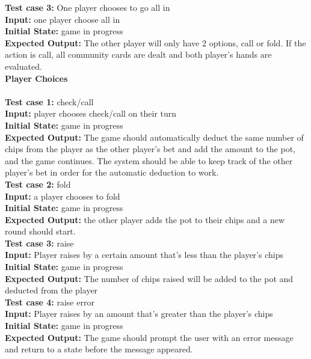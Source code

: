\documentclass[12pt]{article}
\begin{document}
    \noindent \textbf{Test case 3:} One player chooses to go all in \\
    \textbf{Input:} one player choose all in\\
    \textbf{Initial State:} game in progress\\
    \textbf{Expected Output:} The other player will only have 2 options, call or fold. If the action is  
call, all community cards are dealt and both player’s hands are evaluated.  \\

    \noindent \textbf{Player Choices }\\
    \\
    \textbf{Test case 1:} check/call\\ 
    \textbf{Input:} player chooses check/call on their turn\\
    \textbf{Initial State:} game in progress\\
	\textbf{Expected Output: }The game should automatically deduct the same number of chips from the player as the other player’s bet and add the amount to the pot, and the game continues. The system should be able to keep track of the other player’s bet in order for the automatic deduction to work. \\

	 \noindent \textbf{Test case 2:} fold\\
	\textbf{Input:} a player chooses to fold\\
	\textbf{Initial State:} game in progress\\
	\textbf{Expected Output:} the other player adds the pot to their chips and a new round should start.\\
 
    \noindent \textbf{Test case 3:} raise \\
    \textbf{Input:} Player raises by a certain amount that’s less than the player’s chips\\
    \textbf{Initial State: }game in progress\\
	\textbf{Expected Output:} The number of chips raised will be added to the pot and deducted from
the player\\
    
    \noindent \textbf {Test case 4:} raise error \\
    \textbf{Input:} Player raises by an amount that’s greater than the player’s chips\\
	\textbf{Initial State:} game in progress\\
	\textbf{Expected Output:} The game should prompt the user with an error message and return to
	a state before the message appeared.\\
	
\end{document}
